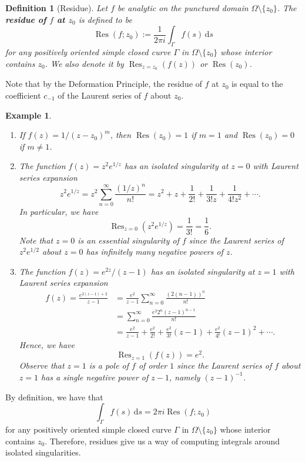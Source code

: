 \documentclass[10pt]{article}
\newcommand{\dd}{\,\mathrm{d}}
\DeclareMathOperator{\Res}{Res}
\theoremstyle{newstyle}
\newtheorem{defn}[thm]{Definition}
\newtheorem{exmp}[thm]{Example}
\begin{document}
\begin{defn}[Residue]
Let $f$ be analytic on the punctured domain $\Omega \setminus \{z_0\}$. The {\bf residue of $f$ 
at $z_0$} is defined to be 
\[ \Res(f; z_0) := \frac{1}{2\pi i} \int_\Gamma f(s)\dd s \]
for any positively oriented simple closed curve $\Gamma$ in $\Omega \setminus \{z_0\}$ 
whose interior contains $z_0$. We also denote it by $\Res_{z=z_0}(f(z))$ or 
$\Res(z_0)$. 
\end{defn}

Note that by the Deformation Principle, the residue of $f$ at $z_0$ is equal to the coefficient 
$c_{-1}$ of the Laurent series of $f$ about $z_0$. 

\begin{exmp}~
\begin{enumerate}[(1)]
    \item If $f(z) = 1/(z-z_0)^m$, then $\Res(z_0) = 1$ if $m = 1$ and $\Res(z_0) = 0$ if 
    $m \neq 1$. 
    \item The function $f(z) = z^2e^{1/z}$ has an isolated singularity at $z = 0$ with Laurent 
    series expansion 
    \[ z^2e^{1/z} = z^2 \sum_{n=0}^\infty \frac{(1/z)^n}{n!} = z^2 + z + \frac1{2!} + 
    \frac1{3!z} + \frac1{4!z^2} + \cdots. \]
    In particular, we have 
    \[ \Res_{z=0}(z^2e^{1/z}) = \frac1{3!} = \frac16. \]
    Note that $z = 0$ is an essential singularity of $f$ since the Laurent series of $z^2e^{1/2}$ 
    about $z = 0$ has infinitely many negative powers of $z$. 
    \item The function $f(z) = e^{2z}/(z-1)$ has an isolated singularity at $z = 1$ with Laurent 
    series expansion
    \begin{align*}
        f(z) = \frac{e^{2(z-1)+2}}{z-1} 
        &= \frac{e^2}{z-1} \sum_{n=0}^\infty \frac{(2(n-1))^n}{n!} \\ 
        &= \sum_{n=0}^\infty \frac{e^2 2^n (z-1)^{n-1}}{n!} \\
        &= \frac{e^2}{z-1} + \frac{e^2}{2!} + \frac{e^2}{3!}(z-1) + \frac{e^2}{4!}(z-1)^2 + \cdots. 
    \end{align*}
    Hence, we have 
    \[ \Res_{z=1}(f(z)) = e^2. \]
    Observe that $z = 1$ is a pole of $f$ of order $1$ since the Laurent series of $f$ about 
    $z = 1$ has a single negative power of $z - 1$, namely $(z-1)^{-1}$. 
\end{enumerate}
\end{exmp}

By definition, we have that 
\[ \int_\Gamma f(s)\dd s = 2\pi i \Res(f; z_0) \]
for any positively oriented simple closed curve $\Gamma$ in $\Omega \setminus \{z_0\}$ 
whose interior contains $z_0$. Therefore, residues give us a way of computing integrals around 
isolated singularities. 
\end{document}
